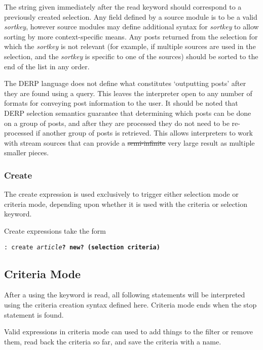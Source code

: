 The string given immediately after the read keyword should correspond to a previously created selection. 
Any field defined by a source module is to be a valid \textit{sortkey}, however source modules may define additional 
syntax for \textit{sortkey} to allow sorting by more context-specific means. Any posts returned from the selection 
for which the \textit{sortkey} is not relevant (for example, if multiple sources are used in the selection, and the 
\textit{sortkey} is specific to one of the sources) should be sorted to the end of the list in any order.

The DERP language does not define what constitutes ‘outputting posts’ after they are found using a query. 
This leaves the interpreter open to any number of formats for conveying post information to the user. 
It should be noted that DERP selection semantics guarantee that determining which posts can be done on a 
group of posts, and after they are processed they do not need to be re-processed if another group of posts 
is retrieved. This allows interpreters to work with stream sources that can provide a \st{semi-infinite} very 
large result as multiple smaller pieces.

\subsubsection{Create}
The create expression is used exclusively to trigger either selection mode or criteria mode, depending upon 
whether it is used with the criteria or selection keyword.

Create expressions take the form
\begin{center}
      \texttt{:  create \textit{article}\bf{?} new\bf{?} \bf{(}selection \bf{\textbar} criteria\bf{)}}\\
\end{center}

\subsection{Criteria Mode}
After a  using the keyword  is read, all following statements will be interpreted using 
the criteria creation syntax defined here. Criteria mode ends when the stop statement is found.

Valid expressions in criteria mode can used to add things to the filter or remove them, read back the criteria so 
far, and save the criteria with a name.

